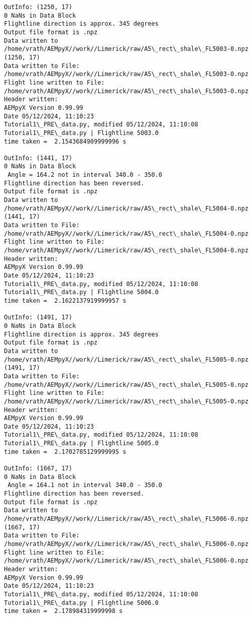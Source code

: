 \documentclass[11pt]{article}
\begin{document}
\begin{Verbatim}[commandchars=\\\{\}]
OutInfo: (1250, 17)
0 NaNs in Data Block
Flightline direction is approx. 345 degrees
Output file format is .npz
Data written to
/home/vrath/AEMpyX//work//Limerick/raw/A5\_rect\_shale\_FL5003-0.npz
(1250, 17)
Data written to File:
/home/vrath/AEMpyX//work//Limerick/raw/A5\_rect\_shale\_FL5003-0.npz
Flight line written to File:
/home/vrath/AEMpyX//work//Limerick/raw/A5\_rect\_shale\_FL5003-0.npz
Header written:
AEMpyX Version 0.99.99
Date 05/12/2024, 11:10:23
Tutorial1\_PRE\_data.py, modified 05/12/2024, 11:10:08
Tutorial1\_PRE\_data.py | Flightline 5003.0
time taken =  2.1543684909999996 s

OutInfo: (1441, 17)
0 NaNs in Data Block
 Angle = 164.2 not in interval 340.0 - 350.0
Flightline direction has been reversed.
Output file format is .npz
Data written to
/home/vrath/AEMpyX//work//Limerick/raw/A5\_rect\_shale\_FL5004-0.npz
(1441, 17)
Data written to File:
/home/vrath/AEMpyX//work//Limerick/raw/A5\_rect\_shale\_FL5004-0.npz
Flight line written to File:
/home/vrath/AEMpyX//work//Limerick/raw/A5\_rect\_shale\_FL5004-0.npz
Header written:
AEMpyX Version 0.99.99
Date 05/12/2024, 11:10:23
Tutorial1\_PRE\_data.py, modified 05/12/2024, 11:10:08
Tutorial1\_PRE\_data.py | Flightline 5004.0
time taken =  2.1622137919999957 s

OutInfo: (1491, 17)
0 NaNs in Data Block
Flightline direction is approx. 345 degrees
Output file format is .npz
Data written to
/home/vrath/AEMpyX//work//Limerick/raw/A5\_rect\_shale\_FL5005-0.npz
(1491, 17)
Data written to File:
/home/vrath/AEMpyX//work//Limerick/raw/A5\_rect\_shale\_FL5005-0.npz
Flight line written to File:
/home/vrath/AEMpyX//work//Limerick/raw/A5\_rect\_shale\_FL5005-0.npz
Header written:
AEMpyX Version 0.99.99
Date 05/12/2024, 11:10:23
Tutorial1\_PRE\_data.py, modified 05/12/2024, 11:10:08
Tutorial1\_PRE\_data.py | Flightline 5005.0
time taken =  2.1702785129999995 s

OutInfo: (1667, 17)
0 NaNs in Data Block
 Angle = 164.1 not in interval 340.0 - 350.0
Flightline direction has been reversed.
Output file format is .npz
Data written to
/home/vrath/AEMpyX//work//Limerick/raw/A5\_rect\_shale\_FL5006-0.npz
(1667, 17)
Data written to File:
/home/vrath/AEMpyX//work//Limerick/raw/A5\_rect\_shale\_FL5006-0.npz
Flight line written to File:
/home/vrath/AEMpyX//work//Limerick/raw/A5\_rect\_shale\_FL5006-0.npz
Header written:
AEMpyX Version 0.99.99
Date 05/12/2024, 11:10:23
Tutorial1\_PRE\_data.py, modified 05/12/2024, 11:10:08
Tutorial1\_PRE\_data.py | Flightline 5006.0
time taken =  2.178984319999998 s


\end{Verbatim}
\end{document}
